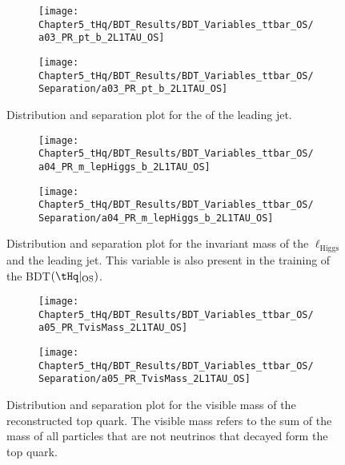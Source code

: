 \begin{figure}[h]
\centering
\begin{subfigure}{.45\textwidth}
  \centering
  \texttt{[image: Chapter5\_tHq/BDT\_Results/BDT\_Variables\_ttbar\_OS/a03\_PR\_pt\_b\_2L1TAU\_OS]}
\end{subfigure}%
\begin{subfigure}{.55\textwidth}
  \centering
  \texttt{[image: Chapter5\_tHq/BDT\_Results/BDT\_Variables\_ttbar\_OS/Separation/a03\_PR\_pt\_b\_2L1TAU\_OS]}
\end{subfigure}
\caption{Distribution and separation plot for the \pT of the leading \btagged jet.}
\label{fig:Appendix:BDTVARS:ttbarOS:a03_PR_pt_b}
\end{figure}

\begin{figure}[h]
\centering
\begin{subfigure}{.45\textwidth}
  \centering
  \texttt{[image: Chapter5\_tHq/BDT\_Results/BDT\_Variables\_ttbar\_OS/a04\_PR\_m\_lepHiggs\_b\_2L1TAU\_OS]}
\end{subfigure}%
\begin{subfigure}{.55\textwidth}
  \centering
  \texttt{[image: Chapter5\_tHq/BDT\_Results/BDT\_Variables\_ttbar\_OS/Separation/a04\_PR\_m\_lepHiggs\_b\_2L1TAU\_OS]}
\end{subfigure}
\caption{Distribution and separation plot for the invariant mass of the $\ell_{\text{Higgs}}$ and the leading \btagged jet.
This variable is also present in the training of the BDT$(\tHq|_{\text{OS}})$.}
\label{fig:Appendix:BDTVARS:ttbarOS:a04_PR_m_lepHiggs_b}
\end{figure}

\begin{figure}[h]
\centering
\begin{subfigure}{.45\textwidth}
  \centering
  \texttt{[image: Chapter5\_tHq/BDT\_Results/BDT\_Variables\_ttbar\_OS/a05\_PR\_TvisMass\_2L1TAU\_OS]}
\end{subfigure}%
\begin{subfigure}{.55\textwidth}
  \centering
  \texttt{[image: Chapter5\_tHq/BDT\_Results/BDT\_Variables\_ttbar\_OS/Separation/a05\_PR\_TvisMass\_2L1TAU\_OS]}
\end{subfigure}
\caption{Distribution and separation plot for the visible mass of the reconstructed top quark. 
The visible mass refers to the sum of the mass of all particles that are not neutrinos that decayed form the top quark.}
\label{fig:Appendix:BDTVARS:ttbarOS:a05_PR_TvisMass}
\end{figure}

